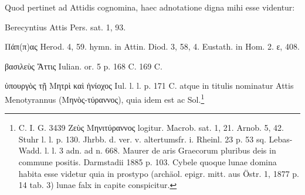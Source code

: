 \documentclass[a4paper, 11pt, oneside, polutonikogreek, german, twocolumn]{article}
\begin{document}
Quod pertinet ad Attidis cognomina, haec adnotatione digna mihi esse videntur:

Berecyntius Attis Pers. sat. 1, 93.

Πάπ(π)ας Herod. 4, 59. hymn. in Attin. Diod. 3, 58, 4. Eustath. in Hom. 2. ε, 408.

βασιλεὺς Ἄττις Iulian. or. 5 p. 168 C. 169 C.

ὑπουργὸς τῇ Μητρὶ καὶ ἡνίοχος Iul. l. l. p. 171 C. atque in titulis nominatur Attis Menotyrannus (Μηνὸς-τύραννος), quia idem est ac Sol.\footnote{C. I. G. 3439 Ζεὺς Μηνιτύραννος logitur. Macrob. sat. 1, 21. Arnob. 5, 42. Stuhr l. l. p. 130. Jhrbb. d. ver. v. altertumsfr. i. Rheinl. 23 p. 53 sq. Lebas-Wadd. l. l. 3 adn. ad n. 668. Maurer de aris Graecorum pluribus deis in commune positis. Darmstadii 1885 p. 103. Cybele quoque lunae domina habita esse videtur quia in prostypo (archäol. epigr. mitt. aus Östr. 1, 1877 p. 14 tab. 3) lunae falx in capite conspicitur.}
\end{document}
